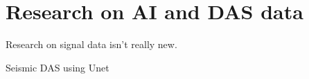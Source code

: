 \section{Research on AI and DAS data}

Research on signal data isn't really new. 

Seismic DAS using Unet \cite{zhu2023seismic}